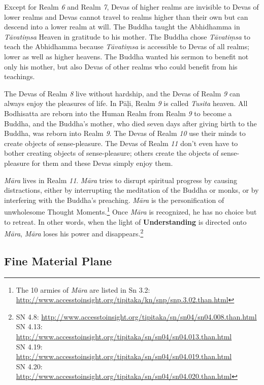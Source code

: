 Except for Realm \textit{6} and Realm \textit{7}, Devas of higher realms are invisible to Devas of lower realms and Devas cannot travel to realms higher than their own but can descend into a lower realm at will. The Buddha taught the Abhidhamma in \textit{Tāvatiṃsa} Heaven in gratitude to his mother. The Buddha chose \textit{Tāvatiṃsa} to teach the Abhidhamma because \textit{Tāvatiṃsa} is accessible to Devas of all realms; lower as well as higher heavens. The Buddha wanted his sermon to benefit not only his mother, but also Devas of other realms who could benefit from his teachings.

The Devas of Realm \textit{8} live without hardship, and the Devas of Realm \textit{9} can always enjoy the pleasures of life. In Pāḷi, Realm \textit{9} is called \textit{Tusita} heaven. All Bodhisatta are reborn into the Human Realm from Realm \textit{9} to become a Buddha, and the Buddha’s mother, who died seven days after giving birth to the Buddha, was reborn into Realm \textit{9}. The Devas of Realm \textit{10} use their minds to create objects of sense-pleasure. The Devas of Realm \textit{11} don’t even have to bother creating objects of sense-pleasure; others create the objects of sense-pleasure for them and these Devas simply enjoy them.

\textit{Māra} lives in Realm \textit{11}. \textit{Māra} tries to disrupt spiritual progress by causing distractions, either by interrupting the meditation of the Buddha or monks, or by interfering with the Buddha’s preaching. \textit{Māra} is the personification of unwholesome Thought Moments.\footnote{The 10 armies of \textit{Māra} are listed in Sn 3.2: \url{http://www.accesstoinsight.org/tipitaka/kn/snp/snp.3.02.than.html}} Once \textit{Māra} is recognized, he has no choice but to retreat. In other words, when the light of \textbf{Understanding} is directed onto \textit{Māra}, \textit{Māra} loses his power and disappears.\footnote{SN 4.8: \url{http://www.accesstoinsight.org/tipitaka/sn/sn04/sn04.008.than.html}\\SN 4.13: \url{http://www.accesstoinsight.org/tipitaka/sn/sn04/sn04.013.than.html}\\SN 4.19: \url{http://www.accesstoinsight.org/tipitaka/sn/sn04/sn04.019.than.html}\\SN 4.20: \url{http://www.accesstoinsight.org/tipitaka/sn/sn04/sn04.020.than.html}}

\subsection*{Fine Material Plane}

